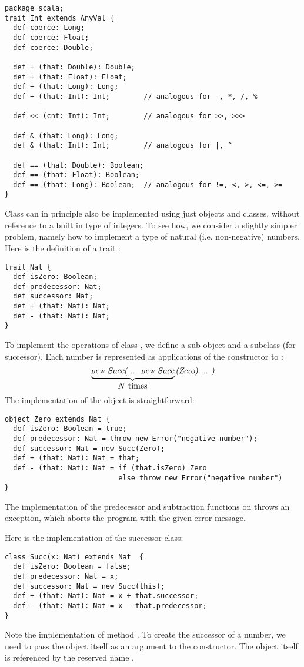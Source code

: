 \begin{lstlisting}
package scala;
trait Int extends AnyVal { 
  def coerce: Long;
  def coerce: Float;
  def coerce: Double;

  def + (that: Double): Double;
  def + (that: Float): Float;
  def + (that: Long): Long;
  def + (that: Int): Int;        // analogous for -, *, /, %

  def << (cnt: Int): Int;        // analogous for >>, >>>

  def & (that: Long): Long;
  def & (that: Int): Int;        // analogous for |, ^

  def == (that: Double): Boolean;
  def == (that: Float): Boolean;
  def == (that: Long): Boolean;  // analogous for !=, <, >, <=, >=
}
\end{lstlisting}

Class  can in principle also be implemented using just
objects and classes, without reference to a built in type of
integers. To see how, we consider a slightly simpler problem, namely
how to implement a type  of natural (i.e. non-negative)
numbers. Here is the definition of a trait :
\begin{lstlisting}
trait Nat {
  def isZero: Boolean;
  def predecessor: Nat;
  def successor: Nat;
  def + (that: Nat): Nat;
  def - (that: Nat): Nat;
}
\end{lstlisting}
To implement the operations of class , we define a sub-object
 and a subclass  (for successor). Each number
 is represented as  applications of the 
constructor to :
\[
\underbrace{\mbox{\sl new Succ( ... new Succ}}_{\mbox{$N$ times}}\mbox{\sl (Zero) ... )}
\]
The implementation of the  object is straightforward:
\begin{lstlisting}
object Zero extends Nat {
  def isZero: Boolean = true;
  def predecessor: Nat = throw new Error("negative number");
  def successor: Nat = new Succ(Zero);
  def + (that: Nat): Nat = that;
  def - (that: Nat): Nat = if (that.isZero) Zero 
                           else throw new Error("negative number")
}
\end{lstlisting}

The implementation of the predecessor and subtraction functions on
 throws an  exception, which aborts the program
with the given error message.

Here is the implementation of the successor class:
\begin{lstlisting}
class Succ(x: Nat) extends Nat  {
  def isZero: Boolean = false;
  def predecessor: Nat = x;
  def successor: Nat = new Succ(this);
  def + (that: Nat): Nat = x + that.successor;
  def - (that: Nat): Nat = x - that.predecessor;
}
\end{lstlisting}
Note the implementation of method . To create the
successor of a number, we need to pass the object itself as an
argument to the  constructor.  The object itself is
referenced by the reserved name .   

